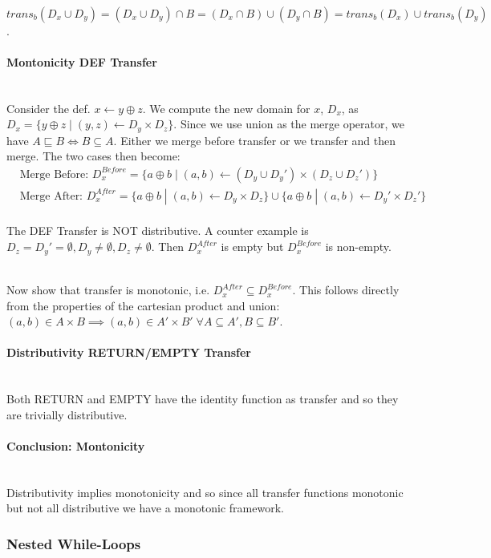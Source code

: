 \documentclass[a4paper]{article}
\newcommand{\NL}[0]{ \hfill\\\noindent }
\begin{document}
\NL
$trans_b(D_x \cup D_y) = (D_x \cup D_y) \cap B = (D_x \cap B) \cup (D_y \cap B) = trans_b(D_x) \cup trans_b(D_y)$.

\paragraph{Montonicity DEF Transfer}\NL
Consider the def. $x \leftarrow y \oplus z$. We compute the new domain for $x$, $D_x$, as $D_x = \{ y \oplus z \;|\; (y,z) \leftarrow D_y \times D_z\}$. Since we use union as the merge operator, we have $A \sqsubseteq B \iff B \subseteq A$. Either we merge before transfer or we transfer and then merge. The two cases then become:
\begin{align*}
&\text{Merge Before: } D_x^{Before} = \{a \oplus b \; | \; (a, b) \leftarrow (D_y \cup D_y') \times (D_z \cup D_z') \} \\
&\text{Merge After: } D_x^{After} = \{a \oplus b \; | \; (a, b) \leftarrow D_y \times D_z \} \cup \{a \oplus b \; | \; (a, b) \leftarrow D_y' \times D_z' \}
\end{align*}
\NL
The DEF Transfer is NOT distributive. A counter example is $D_z = D_y' = \emptyset, D_y\neq \emptyset, D_z \neq \emptyset$. Then $D_x^{After}$ is empty but $D_x^{Before}$ is non-empty. 

\NL
Now show that transfer is monotonic, i.e. $D_x^{After} \subseteq D_x^{Before}$. This follows directly from the properties of the cartesian product and union: $(a,b) \in A \times B \implies (a,b) \in A' \times B' \;\forall A \subseteq A', B \subseteq B'$.

\paragraph{Distributivity RETURN/EMPTY Transfer}\NL
Both RETURN and EMPTY have the identity function as transfer and so they are trivially distributive.

\paragraph{Conclusion: Montonicity}\NL
Distributivity implies monotonicity and so since all transfer functions monotonic but not all distributive we have a monotonic framework. 

\subsubsection{Nested While-Loops}
\end{document}
